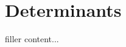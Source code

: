 \documentclass[../../templates/section]{subfiles}
\begin{document}
\section{Determinants}\label{sec:determinants}

filler content...
\end{document}

